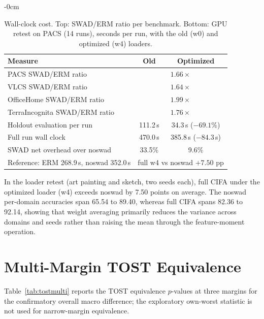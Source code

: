 \documentclass[electronics,article,submit,moreauthors]{Definitions/mdpi}
\begin{document}
\begin{adjustwidth}{-\extralength}{0cm}
\begin{table}[H]
\centering
\caption{Wall-clock cost. Top: SWAD/ERM ratio per benchmark. Bottom: GPU retest on PACS (14 runs), seconds per run, with the old (w0) and optimized (w4) loaders.}
\label{tab:cost}
\setlength{\tabcolsep}{5pt}
\footnotesize
\begin{tabular}{lcc}
\toprule
\textbf{Measure} & \textbf{Old} & \textbf{Optimized}\\
\midrule
PACS SWAD/ERM ratio & \multicolumn{2}{c}{$1.66\times$}\\
VLCS SWAD/ERM ratio & \multicolumn{2}{c}{$1.64\times$}\\
OfficeHome SWAD/ERM ratio & \multicolumn{2}{c}{$1.99\times$}\\
TerraIncognita SWAD/ERM ratio & \multicolumn{2}{c}{$1.76\times$}\\
\midrule
Holdout evaluation per run & 111.2\,s & 34.3\,s ($-69.1\%$)\\
Full run wall clock & 470.0\,s & 385.8\,s ($-84.3$\,s)\\
SWAD net overhead over noswad & 33.5\% & 9.6\%\\
Reference: ERM 268.9\,s, noswad 352.0\,s & \multicolumn{2}{c}{full w4 vs noswad $+7.50$ pp}\\
\bottomrule
\end{tabular}
\vspace{2pt}
\footnotesize In the loader retest (art painting and sketch, two seeds each), full CIFA under the optimized loader (w4) exceeds noswad by 7.50 points on average. The noswad per-domain accuracies span 65.54 to 89.40, whereas full CIFA spans 82.36 to 92.14, showing that weight averaging primarily reduces the variance across domains and seeds rather than raising the mean through the feature-moment operation.
\end{table}

\section{Multi-Margin TOST Equivalence}
\label{sec:apptost}

Table~\ref{tab:tostmulti} reports the TOST equivalence $p$-values at three margins for the confirmatory overall macro difference; the exploratory own-worst statistic is not used for narrow-margin equivalence.


\end{adjustwidth}
\end{document}
